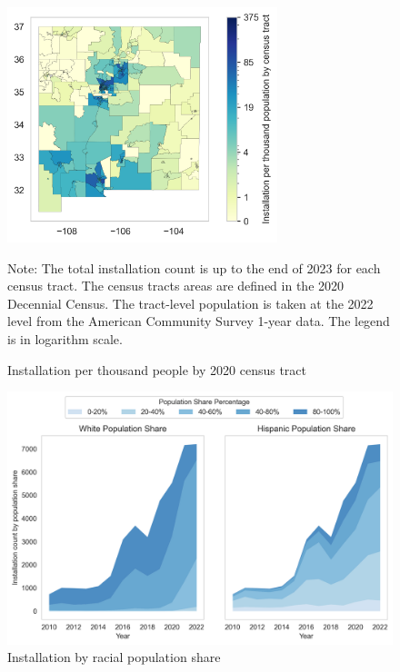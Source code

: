 \documentclass[11pt,twoside,letterpaper]{article}
\begin{document}
\begin{figure}[H]
    \centering
\includegraphics[width=0.7\textwidth]{figures/tract_count_per_kpop_map.png}
    \caption{Installation per thousand people by 2020 census tract}
    \label{fig:install_kpop}
      \begin{flushleft}
        \footnotesize Note: The total installation count is up to the end of 2023 for each census tract. The census tracts areas are defined in the 2020 Decennial Census. The tract-level population is taken at the 2022 level from the American Community Survey 1-year data. The legend is in logarithm scale. 
    \end{flushleft}
\end{figure}

\begin{figure}[H]
    \centering
\includegraphics[width=1\textwidth]{figures/population_quintiles.png}
    \caption{Installation by racial population share}
    \label{fig:population_quintiles}
\end{figure}
\end{document}
